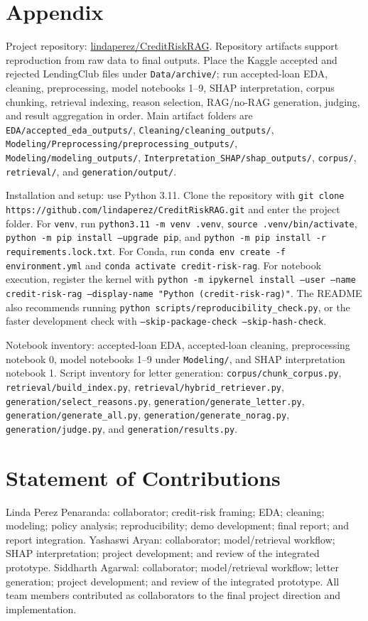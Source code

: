 \documentclass[11pt]{article}
\begin{document}
\appendix
\section{Appendix}
Project repository: \href{https://github.com/lindaperez/CreditRiskRAG}{lindaperez/CreditRiskRAG}. Repository artifacts support reproduction from raw data to final outputs. Place the Kaggle accepted and rejected LendingClub files under \texttt{Data/archive/}; run accepted-loan EDA, cleaning, preprocessing, model notebooks 1--9, SHAP interpretation, corpus chunking, retrieval indexing, reason selection, RAG/no-RAG generation, judging, and result aggregation in order. Main artifact folders are \texttt{EDA/accepted\_eda\_outputs/}, \texttt{Cleaning/cleaning\_outputs/}, \texttt{Modeling/Preprocessing/preprocessing\_outputs/}, \texttt{Modeling/modeling\_outputs/}, \texttt{Interpretation\_SHAP/shap\_outputs/}, \texttt{corpus/}, \texttt{retrieval/}, and \texttt{generation/output/}.

Installation and setup: use Python 3.11. Clone the repository with \texttt{git clone https://github.com/lindaperez/CreditRiskRAG.git} and enter the project folder. For \texttt{venv}, run \texttt{python3.11 -m venv .venv}, \texttt{source .venv/bin/activate}, \texttt{python -m pip install --upgrade pip}, and \texttt{python -m pip install -r requirements.lock.txt}. For Conda, run \texttt{conda env create -f environment.yml} and \texttt{conda activate credit-risk-rag}. For notebook execution, register the kernel with \texttt{python -m ipykernel install --user --name credit-risk-rag --display-name "Python (credit-risk-rag)"}. The README also recommends running \texttt{python scripts/reproducibility\_check.py}, or the faster development check with \texttt{--skip-package-check --skip-hash-check}.

Notebook inventory: accepted-loan EDA, accepted-loan cleaning, preprocessing notebook 0, model notebooks 1--9 under \texttt{Modeling/}, and SHAP interpretation notebook 1. Script inventory for letter generation: \texttt{corpus/chunk\_corpus.py}, \texttt{retrieval/build\_index.py}, \texttt{retrieval/hybrid\_retriever.py}, \texttt{generation/select\_reasons.py}, \texttt{generation/generate\_letter.py}, \texttt{generation/generate\_all.py}, \texttt{generation/generate\_norag.py}, \texttt{generation/judge.py}, and \texttt{generation/results.py}.

\section{Statement of Contributions}
Linda Perez Penaranda: collaborator; credit-risk framing; EDA; cleaning; modeling; policy analysis; reproducibility; demo development; final report; and report integration. Yashaswi Aryan: collaborator; model/retrieval workflow; SHAP interpretation; project development; and review of the integrated prototype. Siddharth Agarwal: collaborator; model/retrieval workflow; letter generation; project development; and review of the integrated prototype. All team members contributed as collaborators to the final project direction and implementation.
\end{document}
